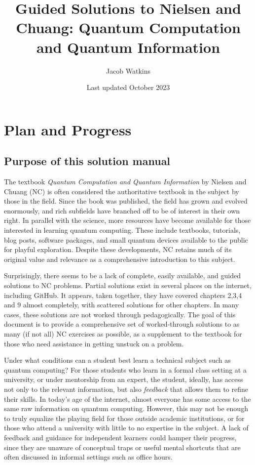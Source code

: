 \documentclass{book}
\title{Guided Solutions to Nielsen and Chuang: Quantum Computation and Quantum Information}
\author{Jacob Watkins}
\date{Last updated October 2023}
\begin{document}
\maketitle

\setcounter{chapter}{-1}
\chapter{Plan and Progress}
\section{Purpose of this solution manual}
The textbook \emph{Quantum Computation and Quantum Information} by Nielsen and Chuang (NC) is often considered the authoritative textbook in the subject by those in the field. Since the book was published, the field has grown and evolved enormously, and rich subfields have branched off to be of interest in their own right. In parallel with the science, more resources have become available for those interested in learning quantum computing. These include textbooks, tutorials, blog posts, software packages, and small quantum devices available to the public for playful exploration. Despite these developments, NC retains much of its original value and relevance as a comprehensive introduction to this subject.

Surprisingly, there seems to be a lack of complete, easily available, and guided solutions to NC problems. Partial solutions exist in several places on the internet, including GitHub. It appears, taken together, they have covered chapters 2,3,4 and 9 almost completely, with scattered solutions for other chapters. In many cases, these solutions are not worked through pedagogically. The goal of this document is to provide a comprehensive set of worked-through solutions to as many (if not all) NC exercises as possible, as a supplement to the textbook for those who need assistance in getting unstuck on a problem.

Under what conditions can a student best learn a technical subject such as quantum computing? For those students who learn in a formal class setting at a university, or under mentorship from an expert, the student, ideally, has access not only to the relevant information, but also \emph{feedback} that allows them to refine their skills. In today's age of the internet, almost everyone has some access to the same raw information on quantum computing. However, this may not be enough to truly equalize the playing field for those outside academic institutions, or for those who attend a university with little to no expertise in the subject. A lack of feedback and guidance for independent learners could hamper their progress, since they are unaware of conceptual traps or useful mental shortcuts that are often discussed in informal settings such as office hours.
\end{document}
